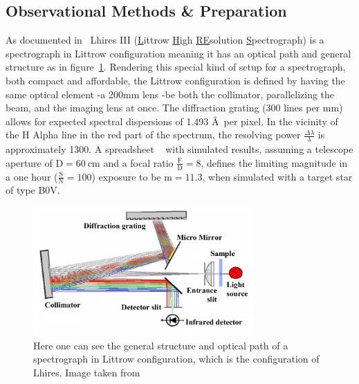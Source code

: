 \documentclass{article}
\begin{document}
\subsection{Observational Methods \& Preparation}
\label{ss:1}
As documented in~\parencite{Shelyak_Instruments} Lhires III (\underline{L}ittrow \underline{H}igh \underline{RE}solution \underline{S}pectrograph) is a spectrograph in Littrow configuration meaning it has an optical path and general structure as in figure~\ref{fig:1}. Rendering this special kind of setup for a spectrograph, both compact and affordable, the Littrow configuration is defined by having the same optical element {-}a 200mm lens {-}be both the collimator, parallelizing the beam, and the imaging lens at once. The diffraction grating (300 lines per mm) allows for expected spectral dispersions of 1.493 \AA ~per pixel. In the vicinity of the H Alpha line in the red part of the spectrum, the resolving power $\frac{\Delta\lambda}{\lambda}$ is approximately 1300. A spreadsheet ~\parencite{Shelyak_Instruments} with simulated results, assuming a telescope aperture of $\text{D}=\SI{60}{\cm}$ and a focal ratio $\frac{\text{F}}{\text{D}}=8$, defines the limiting magnitude in a one hour ($\frac{\text{S}}{\text{N}}=\num{100}$) exposure to be $\text{m}=\num{11.3}$, when simulated with a target star of type B0V.\\
\begin{figure}[H]
	\centering
	\includegraphics[width=0.75\textwidth]{spectroscopy/littrow.png}
	\caption{Here one can see the general structure and optical path of a spectrograph in Littrow configuration, which is the configuration of Lhires. Image taken from~\parencite{Annual_Report_TU_Chemnitz}}
	\label{fig:1}
\end{figure}
\end{document}
